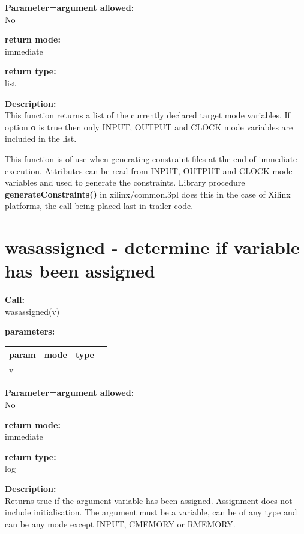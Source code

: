         {\bf Parameter=argument allowed:} \\
        No
        
        {\bf return mode:} \\
        immediate

        {\bf return type:} \\
        list
        
        {\bf Description:} \\
        This function returns a list of the currently declared target mode variables.
        If option {\bf o} is true then only INPUT, OUTPUT and CLOCK mode variables
        are included in the list.
        
        This function is of use when generating constraint files at the end of
        immediate execution. Attributes can be read from INPUT, OUTPUT and CLOCK mode
        variables and used to generate the constraints. Library procedure {\bf
        generateConstraints()}  in
        xilinx/common.3pl does this in the case of Xilinx platforms, the call being
        placed last in trailer code.


    \section{wasassigned - determine if variable has been assigned}\label{sec:ifwasassigned}
        
        
        {\bf Call:} \\
        wasassigned(v)
        
        {\bf parameters:} \\
        \begin{tabular}{| l | l | l | l |}
        \hline
        param  & mode & type & \\
        \hline \hline
        v & - & - & \\ \hline
        \end{tabular}
        
        {\bf Parameter=argument allowed:} \\
        No
        
        {\bf return mode:} \\
        immediate

        {\bf return type:} \\
        log
        
        {\bf Description:} \\
        Returns true if the argument variable has been assigned. Assignment does
        not include initialisation. The argument must be a variable, can be of
        any type and can be any mode except INPUT, CMEMORY or RMEMORY.
        

